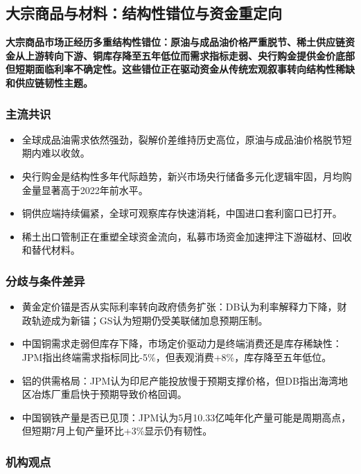 \documentclass[11pt]{ctexart}
\begin{document}
\subsection{大宗商品与材料：结构性错位与资金重定向}
\textbf{大宗商品市场正经历多重结构性错位：原油与成品油价格严重脱节、稀土供应链资金从上游转向下游、铜库存降至五年低位而需求指标走弱、央行购金提供金价底部但短期面临利率不确定性。这些错位正在驱动资金从传统宏观叙事转向结构性稀缺和供应链韧性主题。}
\subsubsection*{主流共识}
\begin{itemize}
  \item 全球成品油需求依然强劲，裂解价差维持历史高位，原油与成品油价格脱节短期内难以收敛。
  \item 央行购金是结构性多年代际趋势，新兴市场央行储备多元化逻辑牢固，月均购金量显著高于2022年前水平。
  \item 铜供应端持续偏紧，全球可观察库存快速消耗，中国进口套利窗口已打开。
  \item 稀土出口管制正在重塑全球资金流向，私募市场资金加速押注下游磁材、回收和替代材料。
\end{itemize}
\subsubsection*{分歧与条件差异}
\begin{itemize}
  \item 黄金定价锚是否从实际利率转向政府债务扩张：DB认为利率解释力下降，财政轨迹成为新锚；GS认为短期仍受美联储加息预期压制。
  \item 中国铜需求走弱但库存下降，市场定价驱动力是终端消费还是库存稀缺性：JPM指出终端需求指标同比-5\%，但表观消费+8\%，库存降至五年低位。
  \item 铝的供需格局：JPM认为印尼产能投放慢于预期支撑价格，但DB指出海湾地区冶炼厂重启快于预期导致价格回调。
  \item 中国钢铁产量是否已见顶：JPM认为5月10.33亿吨年化产量可能是周期高点，但短期7月上旬产量环比+3\%显示仍有韧性。
\end{itemize}
\subsubsection*{机构观点}
\end{document}
